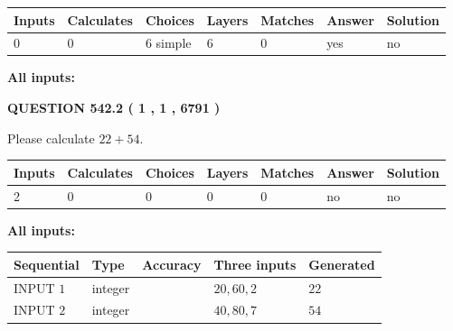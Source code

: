\documentclass[12pt]{article}
\begin{document}
 
\noindent{}
 
 
   
   
   
   
\noindent\begin{tabular}{|l|l|l|l|l|l|l|}
 \hline
Inputs & Calculates & Choices & Layers & Matches & Answer & Solution \\ \hline
 0  & 
 0  & 
 6
  simple  
  & 
 6  & 
 0  & 
  yes & 
  no 
  \\ \hline
 \end{tabular}
   
   
   
   
\noindent{}
   
   
   
   
\noindent\vspace{0.1in}\hspace{-0.08in} {\textbf{\Large{All inputs: }}}
   
   
  
\vspace{0.2in}
  
{\textbf{\Large{QUESTION
542.2 
 ( 1 , 1 , 6791 )
}}}
  
  
 
Please calculate $ %
22 +  %
54 $.
 
 
   
   
   
   
\noindent\begin{tabular}{|l|l|l|l|l|l|l|}
 \hline
Inputs & Calculates & Choices & Layers & Matches & Answer & Solution \\ \hline
 2  & 
 0  & 
 0
  & 
 0  & 
 0  & 
  no & 
  no 
  \\ \hline
 \end{tabular}
   
   
   
   
\noindent{}
   
   
   
   
\noindent\vspace{0.1in}\hspace{-0.08in} {\textbf{\Large{All inputs: }}}
   
   
  
  
\noindent\begin{tabular}{|l|l|l|l|l|}
\hline
 Sequential & Type & Accuracy & Three inputs & Generated \\ 
\hline
 
 
  INPUT $  1 $ & integer &  & $
 20
 , 
 60
 , 
 2
 $ & $ 22 $ 
 \\  \hline  
 
 
  INPUT $  2 $ & integer &  & $
 40
 , 
 80
 , 
 7
 $ & $ 54 $ 
 \\  \hline  
 \end{tabular}
   
\end{document}
